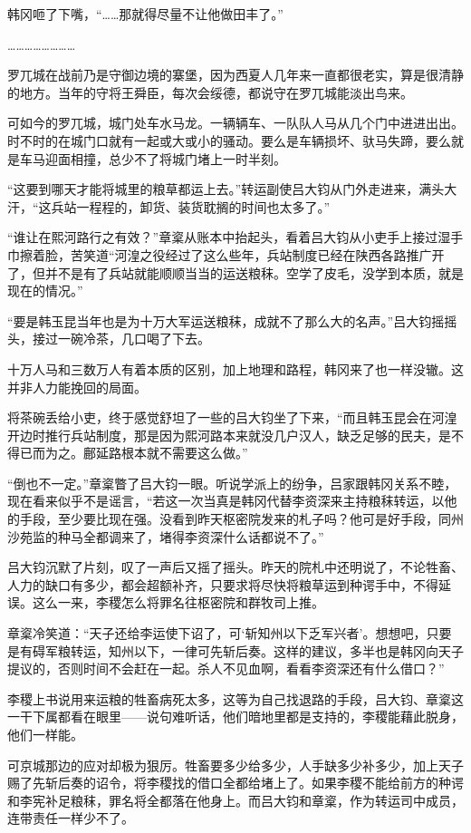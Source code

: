 韩冈咂了下嘴，“……那就得尽量不让他做田丰了。”

……………………

罗兀城在战前乃是守御边境的寨堡，因为西夏人几年来一直都很老实，算是很清静的地方。当年的守将王舜臣，每次会绥德，都说守在罗兀城能淡出鸟来。

可如今的罗兀城，城门处车水马龙。一辆辆车、一队队人马从几个门中进进出出。时不时的在城门口就有一起或大或小的骚动。要么是车辆损坏、驮马失蹄，要么就是车马迎面相撞，总少不了将城门堵上一时半刻。

“这要到哪天才能将城里的粮草都运上去。”转运副使吕大钧从门外走进来，满头大汗，“这兵站一程程的，卸货、装货耽搁的时间也太多了。”

“谁让在熙河路行之有效？”章楶从账本中抬起头，看着吕大钧从小吏手上接过湿手巾擦着脸，苦笑道“河湟之役经过了这么些年，兵站制度已经在陕西各路推广开了，但并不是有了兵站就能顺顺当当的运送粮秣。空学了皮毛，没学到本质，就是现在的情况。”

“要是韩玉昆当年也是为十万大军运送粮秣，成就不了那么大的名声。”吕大钧摇摇头，接过一碗冷茶，几口喝了下去。

十万人马和三数万人有着本质的区别，加上地理和路程，韩冈来了也一样没辙。这并非人力能挽回的局面。

将茶碗丢给小吏，终于感觉舒坦了一些的吕大钧坐了下来，“而且韩玉昆会在河湟开边时推行兵站制度，那是因为熙河路本来就没几户汉人，缺乏足够的民夫，是不得已而为之。鄜延路根本就不需要这么做。”

“倒也不一定。”章楶瞥了吕大钧一眼。听说学派上的纷争，吕家跟韩冈关系不睦，现在看来似乎不是谣言，“若这一次当真是韩冈代替李资深来主持粮秣转运，以他的手段，至少要比现在强。没看到昨天枢密院发来的札子吗？他可是好手段，同州沙苑监的种马全都调来了，堵得李资深什么话都说不了。”

吕大钧沉默了片刻，叹了一声后又摇了摇头。昨天的院札中还明说了，不论牲畜、人力的缺口有多少，都会超额补齐，只要求将尽快将粮草运到种谔手中，不得延误。这么一来，李稷怎么将罪名往枢密院和群牧司上推。

章楶冷笑道：“天子还给李运使下诏了，可‘斩知州以下乏军兴者’。想想吧，只要是有碍军粮转运，知州以下，一律可先斩后奏。这样的建议，多半也是韩冈向天子提议的，否则时间不会赶在一起。杀人不见血啊，看看李资深还有什么借口？”

李稷上书说用来运粮的牲畜病死太多，这等为自己找退路的手段，吕大钧、章楶这一干下属都看在眼里——说句难听话，他们暗地里都是支持的，李稷能藉此脱身，他们一样能。

可京城那边的应对却极为狠厉。牲畜要多少给多少，人手缺多少补多少，加上天子赐了先斩后奏的诏令，将李稷找的借口全都给堵上了。如果李稷不能给前方的种谔和李宪补足粮秣，罪名将全都落在他身上。而吕大钧和章楶，作为转运司中成员，连带责任一样少不了。

